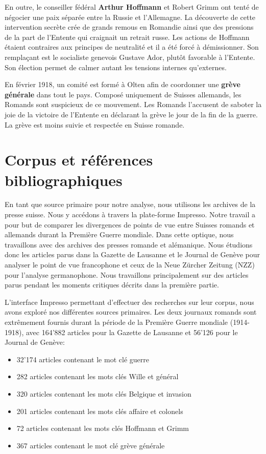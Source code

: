 \documentclass[french,a4paper]{article}
\begin{document}
En outre, le conseiller fédéral \textbf{Arthur Hoffmann} et Robert Grimm ont tenté de négocier une paix séparée entre la Russie et l'Allemagne.
La découverte de cette intervention secrète crée de grands remous en Romandie ainsi que des pressions de la part de l'Entente qui craignait un retrait russe.
Les actions de Hoffmann étaient contraires aux principes de neutralité et il a été forcé à démissionner.
Son remplaçant est le socialiste genevois Gustave Ador, plutôt favorable à l'Entente.
Son élection permet de calmer autant les tensions internes qu'externes.

En février 1918, un comité est formé à Olten afin de coordonner une \textbf{grève générale} dans tout le pays.
Composé uniquement de Suisses allemands, les Romands sont suspicieux de ce mouvement.
Les Romands l'accusent de saboter la joie de la victoire de l'Entente en déclarant la grève le jour de la fin de la guerre.
La grève est moins suivie et respectée en Suisse romande. \cite{sprachenfrieden}

\section*{Corpus et références bibliographiques}

En tant que source primaire pour notre analyse, nous utilisons les archives de la presse suisse.
Nous y accédons à travers la plate-forme Impresso.
Notre travail a pour but de comparer les divergences de points de vue entre Suisses romands et allemands durant la Première Guerre mondiale.
Dans cette optique, nous travaillons avec des archives des presses romande et alémanique.
Nous étudions donc les articles parus dans la Gazette de Lausanne et le Journal de Genève pour analyser le point de vue francophone et ceux de la Neue Zürcher Zeitung (NZZ) pour l'analyse germanophone.
Nous travaillons principalement sur des articles parus pendant les moments critiques décrits dans la première partie.

L'interface Impresso permettant d'effectuer des recherches sur leur corpus, nous avons exploré nos différentes sources primaires.
Les deux journaux romands sont extrêmement fournis durant la période de la Première Guerre mondiale (1914-1918), avec 164'882 articles pour la Gazette de Lausanne et 56'126 pour le Journal de Genève:

\begin{itemize}
    \item 32'174 articles contenant le mot clé \og guerre \fg{}
    \item 282 articles contenant les mots clés \og Wille \fg{} et \og général \fg{}
    \item 320 articles contenant les mots clés \og Belgique \fg{} et \og invasion \fg{}
    \item 201 articles contenant les mots clés \og affaire \fg{} et \og colonels \fg{}
    \item 72 articles contenant les mots clés \og Hoffmann \fg{} et \og Grimm \fg{}
    \item 367 articles contenant le mot clé \og grève générale \fg{}
\end{itemize}
\end{document}
